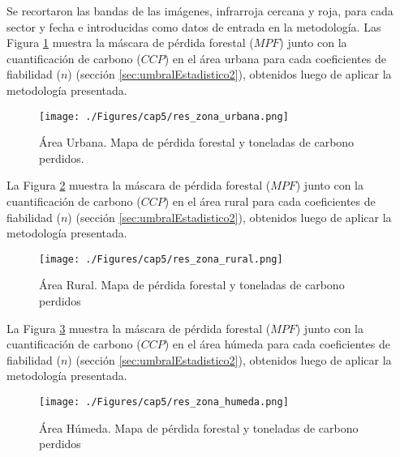 Se recortaron las bandas de las im\'agenes, infrarroja cercana y roja, para cada sector y fecha e introducidas como datos de entrada en la metodolog\'ia. Las Figura \ref{fig:ubana} muestra la m\'ascara de p\'erdida forestal ($ MPF $) junto con la cuantificaci\'on de carbono ($ CCP $) en el \'area urbana para cada coeficientes de fiabilidad ($ n $) (secci\'on \ref{sec:umbralEstadistico2}), obtenidos luego de aplicar la metodolog\'ia presentada.
\begin{figure}[H]
	\centering
	\texttt{[image: ./Figures/cap5/res\_zona\_urbana.png]}
	\caption{\'Area Urbana. Mapa de p\'erdida forestal y toneladas de carbono perdidos.}
	\label{fig:ubana}
\end{figure}
La Figura \ref{fig:rural} muestra la m\'ascara de p\'erdida forestal ($ MPF $) junto con la cuantificaci\'on de carbono ($ CCP $) en el \'area rural para cada coeficientes de fiabilidad ($ n $) (secci\'on \ref{sec:umbralEstadistico2}), obtenidos luego de aplicar la metodolog\'ia presentada. 
\begin{figure}[H]
	\centering
	\texttt{[image: ./Figures/cap5/res\_zona\_rural.png]}
	\caption{\'Area Rural. Mapa de p\'erdida forestal y toneladas de carbono perdidos}
	\label{fig:rural}
\end{figure}
La Figura \ref{fig:humeda} muestra la m\'ascara de p\'erdida forestal ($ MPF $) junto con la cuantificaci\'on de carbono ($ CCP $) en el \'area h\'umeda para cada coeficientes de fiabilidad ($ n $) (secci\'on \ref{sec:umbralEstadistico2}), obtenidos luego de aplicar la metodolog\'ia presentada.
\begin{figure}[H]
	\centering
	\texttt{[image: ./Figures/cap5/res\_zona\_humeda.png]}
	\caption{\'Area H\'umeda. Mapa de p\'erdida forestal y toneladas de carbono perdidos}
	\label{fig:humeda}
\end{figure}


